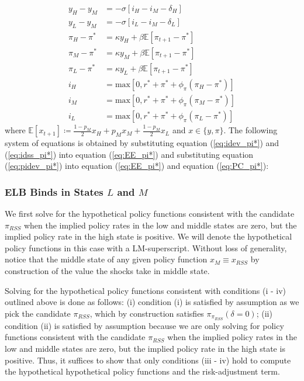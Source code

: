 \documentclass[11pt]{article}
\begin{document}
\begin{singlespace}
		\begin{align}
		y_{H}-y_{M} & = - \sigma\left[i_{H} - i_M - \delta_{H}\right] \label{eq:EE_H_appx} \\
		y_{L}-y_{M} & = - \sigma\left[i_{L} - i_M - \delta_{L}\right] \label{eq:EE_L_appx}\\
		\pi_{H} - \pi^* & = \kappa y_{H} + \beta\mathbb{E}[\pi_{t+1} - \pi^*] \label{eq:PC_H_appx}\\
		\pi_{M} - \pi^* & = \kappa y_{M} + \beta\mathbb{E}[\pi_{t+1} - \pi^*] \label{eq:PC_M_appx}\\
		\pi_{L} - \pi^* & = \kappa y_{L} + \beta\mathbb{E}[\pi_{t+1} - \pi^*] \label{eq:PC_L_appx}\\
		i_{H} & = \text{max}\left[0, r^* + \pi^* +  \phi_{\pi}(\pi_{H} - \pi^*)\right] \label{eq:TR_H_appx}\\
		i_{M} & = \text{max}\left[0, r^* + \pi^* + \phi_{\pi}(\pi_{M} - \pi^*)\right] \label{eq:TR_M_appx}\\
		i_{L} & = \text{max}\left[0, r^* + \pi^* + \phi_{\pi}(\pi_{L} - \pi^*)\right] \label{eq:TR_L_appx}
		\end{align}
		where $\mathbb{E}[x_{t+1}] \coloneqq \frac{1-p_M}{2}x_H + p_Mx_M + \frac{1-p_M}{2}x_L$ and $x\in\{y,\pi\}$. The following system of equations is obtained by substituting equation (\ref{eq:idev_pi*}) and (\ref{eq:idss_pi*}) into equation (\ref{eq:EE_pi*}) and  substituting equation (\ref{eq:pidev_pi*}) into equation (\ref{eq:EE_pi*}) and equation (\ref{eq:PC_pi*}):  
		
		\subsubsection{ELB Binds in States $L$ and $M$}
		
		We first solve for the hypothetical policy functions consistent with the candidate $\pi_{RSS}$ when the implied policy rates in the low and middle states are zero, but the implied policy rate in the high state is positive. We will denote the hypothetical policy functions in this case with a LM-superscript. Without loss of generality, notice that the middle state of any given policy function $x_M \equiv x_{RSS}$ by construction of the value the shocks take in middle state.
		
		Solving for the hypothetical policy functions consistent with conditions (i - iv) outlined above is done as follows: (i) condition (i) is satisfied by assumption as we pick the candidate $\pi_{RSS}$, which by construction satisfies $\pi_{\pi_{RSS}}(\delta=0)$; (ii) condition (ii) is satisfied by assumption because we are only solving for policy functions consistent with the candidate $\pi_{RSS}$ when the implied policy rates in the low and middle states are zero, but the implied policy rate in the high state is positive. Thus, it suffices to show that only conditions (iii - iv) hold to compute the hypothetical hypothetical policy functions and the risk-adjustment term. 
		

\end{singlespace}
\end{document}
